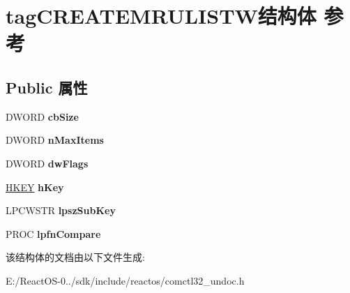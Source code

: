 \hypertarget{structtag_c_r_e_a_t_e_m_r_u_l_i_s_t_w}{}\section{tag\+C\+R\+E\+A\+T\+E\+M\+R\+U\+L\+I\+S\+T\+W结构体 参考}
\label{structtag_c_r_e_a_t_e_m_r_u_l_i_s_t_w}
\subsection*{Public 属性}
\begin{DoxyCompactItemize}
\item 
\mbox{\label{structtag_c_r_e_a_t_e_m_r_u_l_i_s_t_w_abff13593746afc6cc214936cfb66a22a}} 
D\+W\+O\+RD {\bfseries cb\+Size}
\item 
\mbox{\label{structtag_c_r_e_a_t_e_m_r_u_l_i_s_t_w_ade54d82e35ec0b7ada77598c0d705712}} 
D\+W\+O\+RD {\bfseries n\+Max\+Items}
\item 
\mbox{\label{structtag_c_r_e_a_t_e_m_r_u_l_i_s_t_w_aeec6e2e7648fa2e5e2f3d31ab5a62eeb}} 
D\+W\+O\+RD {\bfseries dw\+Flags}
\item 
\mbox{\label{structtag_c_r_e_a_t_e_m_r_u_l_i_s_t_w_a5154b81210c052c019fb289d62a95304}} 
\hyperlink{interfacevoid}{H\+K\+EY} {\bfseries h\+Key}
\item 
\mbox{\label{structtag_c_r_e_a_t_e_m_r_u_l_i_s_t_w_a658ce3cfdf8ff7442abb4a2b4beb63e0}} 
L\+P\+C\+W\+S\+TR {\bfseries lpsz\+Sub\+Key}
\item 
\mbox{\label{structtag_c_r_e_a_t_e_m_r_u_l_i_s_t_w_ae30450046344b9d3b7481befab524fd2}} 
P\+R\+OC {\bfseries lpfn\+Compare}
\end{DoxyCompactItemize}


该结构体的文档由以下文件生成\+:\begin{DoxyCompactItemize}
\item 
E\+:/\+React\+O\+S-\/0../sdk/include/reactos/comctl32\+\_\+undoc.\+h\end{DoxyCompactItemize}

